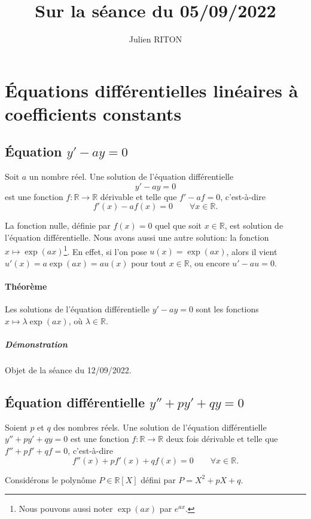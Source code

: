 \documentclass[10pt,a4paper]{article}
\author{Julien RITON}
\title{Sur la séance du 05/09/2022}
\begin{document}
\maketitle

\section{Équations différentielles linéaires à coefficients constants}
\subsection{Équation $y'-ay=0$}
Soit $a$ un nombre réel.
Une solution de l'équation différentielle 
$$y'-ay=0$$
est une fonction $f:\mathbb{R}\rightarrow \mathbb{R}$ dérivable et telle que $f'-af=0$,
c'est-à-dire
$$f'(x) - a f(x) = 0 \qquad \forall x\in \mathbb{R}.$$


La fonction nulle, définie par $f(x)=0$ quel que soit $ x\in \mathbb{R}$, est solution de l'équation différentielle.
Nous avons aussi une autre solution: la fonction $x\mapsto \exp(ax)$\footnote{Nous pouvons aussi noter $\exp(ax)$ par $e^{ax}$.}. En effet, si l'on pose $u(x)=\exp(ax)$, alors il vient $u'(x)=a \exp(ax) = a u(x)$ pour tout $x\in\mathbb{R}$, ou encore $u'-au=0$.

\paragraph{Théorème}
Les solutions de l'équation différentielle $y'-ay=0$ sont les fonctions $x\mapsto \lambda \exp(ax)$, où $\lambda\in\mathbb{R}$.

\subparagraph{Démonstration}
Objet de la séance du 12/09/2022.


\subsection{Équation différentielle $y''+py'+qy=0$}
Soient $p$ et $q$ des nombres réels.
Une solution de l'équation différentielle $y''+py'+qy=0$ est une fonction $f:\mathbb{R}\rightarrow \mathbb{R}$ deux fois dérivable et telle que $f''+pf'+qf=0$, 
c'est-à-dire
$$f''(x) + p f'(x) + q f(x) = 0 \qquad \forall x\in \mathbb{R}.$$

Considérons le polynôme $P\in\mathbb{R}[X]$ défini par $P=X^2+pX+q$.
\end{document}
